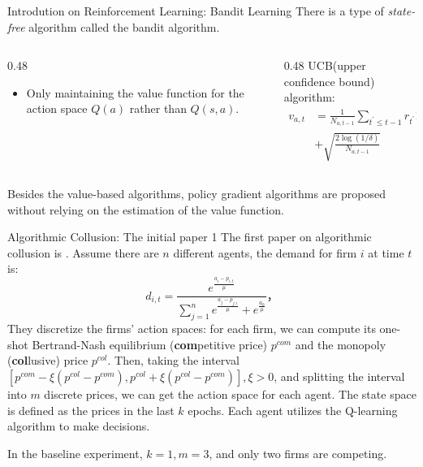 \documentclass[8pt]{beamer}
\begin{document}
\begin{frame}{Introdution on Reinforcement Learning: Bandit Learning}
    There is a type of \textit{state-free} algorithm called the bandit algorithm.
    \vspace{1cm}

    \begin{columns}
        \begin{column}{0.48\textwidth}
            \begin{itemize}
                \item Only maintaining the value function for the action space $Q(a)$ rather than $Q(s,a)$.
            \end{itemize}
        \end{column}
        \begin{column}{0.48\textwidth}
            UCB(upper confidence bound) algorithm:
            \[\begin{aligned}
                v_{a,t}&=\frac{1}{N_{a,t-1}}\sum_{t^{\prime}\leq t-1}r_{t^{\prime}}1\left\{a_{t^{\prime}}=a\right\}\\ &+\sqrt{\frac{2\log(1/\delta)}{N_{a,t-1}}}
            \end{aligned}\]
        \end{column}
    \end{columns}

    \vspace{0.5cm}
    Besides the value-based algorithms, policy gradient algorithms are proposed without relying on the estimation of the value function.
\end{frame}

\begin{frame}{Algorithmic Collusion: The initial paper 1}
    The first paper on algorithmic collusion is \cite{calvano2020artificial}. Assume there are $n$ different agents, the demand for firm $i$ at time $t$ is:
    \begin{equation}
        d_{i,t}=\frac{e^{\frac{a_i-p_{i,t}}\mu}}{\sum_{j=1}^ne^{\frac{a_j-p_{j,\iota}}\mu}+e^{\frac{a_0}\mu}}，
    \end{equation}
    They discretize the firms' action spaces: for each firm, we can compute its one-shot Bertrand-Nash equilibrium (\textbf{com}petitive price) $p^{com}$ and the monopoly (\textbf{col}lusive) price $p^{col}$. Then, taking the interval $[p^{com}-\xi(p^{col}-p^{com}), p^{col}+\xi(p^{col}-p^{com})], \xi>0$, and splitting the interval into $m$ discrete prices, we can get the action space for each agent. The state space is defined as the prices in the last $k$ epochs. Each agent utilizes the Q-learning algorithm to make decisions.
    \vspace{0.5cm}
    
    In the baseline experiment, $k=1, m=3$, and only two firms are competing.
\end{frame}
\end{document}
